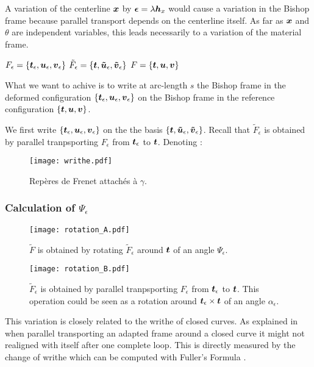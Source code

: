 A variation of the centerline $\boldsymbol{x}$ by $\boldsymbol{\epsilon} = \lambda \boldsymbol{h}_x$ would cause a variation in the Bishop frame because parallel transport depends on the centerline itself. As far as $\boldsymbol{x}$ and $\theta$ are independent variables, this leads necessarily to a variation of the material frame.

$F_\epsilon = \{\boldsymbol{t}_\epsilon, \boldsymbol{u}_\epsilon,\boldsymbol{v}_\epsilon\}$
$\tilde{F}_\epsilon = \{\boldsymbol{t}, \boldsymbol{\tilde{u}}_\epsilon,\boldsymbol{\tilde{v}}_\epsilon\}$
$F = \{\boldsymbol{t}, \boldsymbol{u},\boldsymbol{v}\}$

What we want to achive is to write at arc-length $s$ the Bishop frame in the deformed configuration $\{\boldsymbol{t}_\epsilon, \boldsymbol{u}_\epsilon,\boldsymbol{v}_\epsilon\}$ on the Bishop frame in the reference configuration $\{\boldsymbol{t}, \boldsymbol{u},\boldsymbol{v}\}$.

We first write $\{\boldsymbol{t}_\epsilon, \boldsymbol{u}_\epsilon,\boldsymbol{v}_\epsilon\}$ on the the basis $\{\boldsymbol{t}, \boldsymbol{\tilde{u}}_\epsilon,\boldsymbol{\tilde{v}}_\epsilon\}$. Recall that $\tilde{F}_\epsilon$ is obtained by parallel tranpsporting $F_\epsilon$ from $\boldsymbol{t}_\epsilon$ to $\boldsymbol{t}$. Denoting :

\begin{figure}[t] 
\centering 
\texttt{[image: writhe.pdf]} 
\caption{Repères de Frenet attachés à $\gamma$.}
\label{fig:1_1}
\end{figure}

\subsubsection{Calculation of $\Psi_\epsilon$}

\begin{figure}[p] 
\centering 
\texttt{[image: rotation\_A.pdf]} 
\caption{$\tilde{F}$ is obtained by rotating $\tilde{F}_\epsilon$ around $\boldsymbol{t}$ of an angle $\Psi_\epsilon$.}
\texttt{[image: rotation\_B.pdf]} 
\caption{$\tilde{F}_\epsilon$ is obtained by parallel tranpsporting $F_\epsilon$ from $\boldsymbol{t}_\epsilon$ to $\boldsymbol{t}$. This operation could be seen as a rotation around $\boldsymbol{t}_\epsilon \times \boldsymbol{t}$ of an angle $\alpha_\epsilon$.}
\label{A}
\end{figure}

This variation is closely related to the writhe of closed curves. As explained in \cite{Fuller1978} when parallel transporting an adapted frame around a closed curve it might not realigned with itself after one complete loop. This  is directly measured by the change of writhe which can be computed with Fuller's Formula \cite{Fuller1978}.

